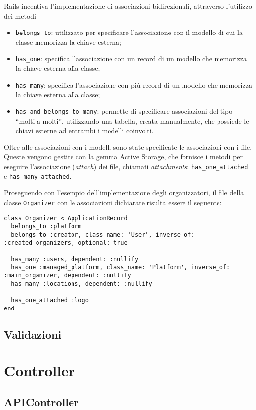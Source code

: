 Rails incentiva l'implementazione di associazioni bidirezionali, attraverso l'utilizzo dei metodi:
\begin{itemize}
	\item \verb|belongs_to|: utilizzato per specificare l'associazione con il modello di cui la classe memorizza la chiave esterna;
	\item \verb|has_one|: specifica l'associazione con un record di un modello che memorizza la chiave esterna alla classe;
	\item \verb|has_many|: specifica l'associazione con più record di un modello che memorizza la chiave esterna alla classe;
	\item \verb|has_and_belongs_to_many|: permette di specificare associazioni del tipo ``molti a molti'', utilizzando una tabella, creata manualmente, che possiede le chiavi esterne ad entrambi i modelli coinvolti.
\end{itemize}
Oltre alle associazioni con i modelli sono state specificate le associazioni con i file. Queste vengono gestite con la gemma Active Storage, che fornisce i metodi per eseguire l'associazione (\emph{attach}) dei file, chiamati \emph{attachments}: \verb|has_one_attached| e \verb|has_many_attached|.

Proseguendo con l'esempio dell'implementazione degli organizzatori, il file della classe \verb|Organizer| con le associazioni dichiarate risulta essere il seguente:
\begin{verbatim}
class Organizer < ApplicationRecord
  belongs_to :platform
  belongs_to :creator, class_name: 'User', inverse_of: :created_organizers, optional: true

  has_many :users, dependent: :nullify
  has_one :managed_platform, class_name: 'Platform', inverse_of: :main_organizer, dependent: :nullify
  has_many :locations, dependent: :nullify

  has_one_attached :logo
end
\end{verbatim}

\subsection{Validazioni} \label{code:validates}

\section{Controller}
\subsection{APIController}

